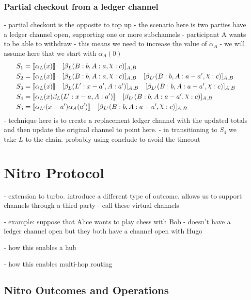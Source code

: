 \documentclass{article}
\DeclareRobustCommand{\rchi}{{\mathpalette\irchi\relax}}
\newcommand{\irchi}[2]{\raisebox{\depth}{$#1\chi$}} %
\theoremstyle{definition}
\newcommand{\adj}[1]{\llbracket #1 \rrbracket}
\newcommand{\enf}[1]{[#1]}
\begin{document}
\subsubsection{Partial checkout from a ledger channel}

- partial checkout is the opposite to top up
- the scenario here is two parties have a ledger channel open, supporting one or more subchannels
- participant A wants to be able to withdraw 
- this means we need to increase the value of $\alpha_A$ 
- we will assume here that we start with $\alpha_A(0)$
\begin{align*}
S_1 &= \adj{\alpha_L(x)} \quad \enf{\beta_L(B: b, A: a, \rchi: c)}_{A, B}  \\
S_2 &= \adj{\alpha_L(x)} \quad \enf{\beta_L(B: b, A: a, \rchi: c)}_{A, B} \quad \enf{\beta_{L'}(B: b, A: a - a', \rchi: c)}_{A, B}\\
S_3 &= \adj{\alpha_L(x)} \quad \enf{\beta_L(L': x-a', A: a')}_{A, B} \quad \enf{\beta_{L'}(B: b, A: a - a', \rchi: c)}_{A, B}\\
S_4 &= \adj{\alpha_L(x)\beta_L(L': x-a, A: a')} \quad \enf{\beta_{L'}(B: b, A: a - a', \rchi: c)}_{A, B}\\
S_5 &= \adj{\alpha_{L'}(x-a')\alpha_A(a')} \quad \enf{\beta_{L'}(B: b, A: a - a', \rchi: c)}_{A, B}
\end{align*}
- technique here is to create a replacement ledger channel with the updated totals and then update the 
  original channel to point here.
- in transitioning to $S_4$ we take $L$ to the chain. probably using conclude to avoid the timeout

\section{Nitro Protocol}

% 

- extension to turbo. introduce a different type of outcome. allows us to support channels through
  a third party
- call these virtual channels

- example: suppose that Alice wants to play chess with Bob
- doesn't have a ledger channel open but they both have a channel open with Hugo

- how this enables a hub

- how this enables multi-hop routing

\subsection{Nitro Outcomes and Operations}
\end{document}
